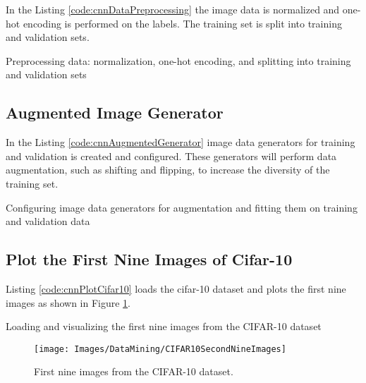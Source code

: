 In the Listing \ref{code:cnnDataPreprocessing} the image data is normalized and one-hot encoding is performed on the labels. The training set is split into training and validation sets.

\begin{code}[h!]
	    
	
	\caption{Preprocessing data: normalization, one-hot encoding, and splitting into training and validation sets}
	\label{code:cnnDataPreprocessing}
\end{code}

\subsection{Augmented Image Generator}

In the Listing \ref{code:cnnAugmentedGenerator} image data generators for training and validation is created and configured. These generators will perform data augmentation, such as shifting and flipping, to increase the diversity of the training set.

\begin{code}[h!]
	    
	
	\caption{Configuring image data generators for augmentation and fitting them on training and validation data}
	\label{code:cnnAugmentedGenerator}
\end{code}

\subsection{Plot the First Nine Images of Cifar-10}

Listing \ref{code:cnnPlotCifar10} loads the cifar-10 dataset and plots the first nine images as shown in Figure \ref{fig:cnnFirstNineCifar10}.

\begin{code}[h!]
	    
	
	\caption{Loading and visualizing the first nine images from the CIFAR-10 dataset}
	\label{code:cnnPlotCifar10}
\end{code}

\begin{figure}[h!]
	\centering
	\texttt{[image: Images/DataMining/CIFAR10SecondNineImages]}
	\caption{First nine images from the CIFAR-10 dataset.} \label{fig:cnnFirstNineCifar10}
\end{figure}

